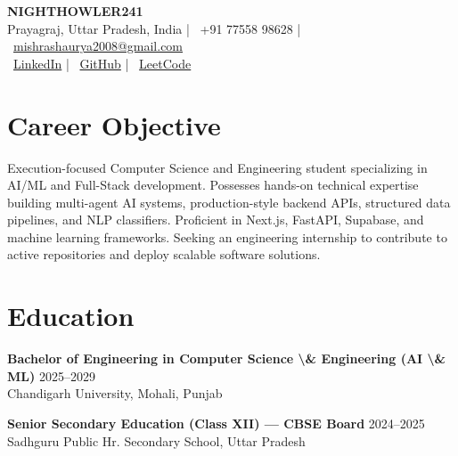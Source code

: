 \documentclass[11pt,a4paper]{article}
\begin{document}
\begin{center}
    {\fontsize{18}{20}\selectfont \textbf{NIGHTHOWLER241}}\\[4pt]
    \small Prayagraj, Uttar Pradesh, India \;|\;
    \faPhone\ +91 77558 98628 \;|\;
    \faEnvelope\ \href{mailto:mishrashaurya2008@gmail.com}{mishrashaurya2008@gmail.com}\\
    \faLinkedin\ \href{https://www.linkedin.com/in/shaurya-mishra-33a564370/}{LinkedIn} \;|\;
    \faGithub\ \href{https://github.com/Shaurya001-web}{GitHub} \;|\;
    \faCode\ \href{https://leetcode.com/u/MrRabbit_011/}{LeetCode}
\end{center}

\vspace{-0.1cm}

\section*{Career Objective}
\small Execution-focused Computer Science and Engineering student specializing in AI/ML and Full-Stack development. Possesses hands-on technical expertise building multi-agent AI systems, production-style backend APIs, structured data pipelines, and NLP classifiers. Proficient in Next.js, FastAPI, Supabase, and machine learning frameworks. Seeking an engineering internship to contribute to active repositories and deploy scalable software solutions.

\section*{Education}

\textbf{Bachelor of Engineering in Computer Science \textbackslash{}& Engineering (AI \textbackslash{}& ML)} \hfill 2025–2029\\
Chandigarh University, Mohali, Punjab\\

\vspace{0.1cm}

\textbf{Senior Secondary Education (Class XII) — CBSE Board} \hfill 2024–2025\\
Sadhguru Public Hr. Secondary School, Uttar Pradesh\\

\vspace{0.1cm}
\end{document}
